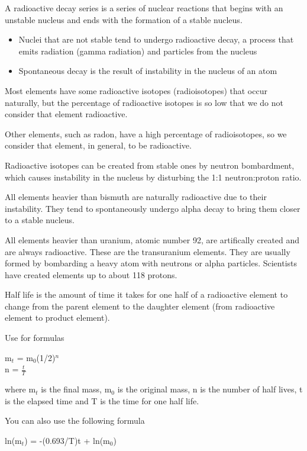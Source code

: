 \documentclass[../hchem.tex]{subfiles}
\begin{document}
A radioactive decay series is a series of nuclear reactions that begins with an unstable nucleus and ends with the formation of a stable nucleus.

\begin{itemize}
    \item Nuclei that are not stable tend to undergo radioactive decay, a process that emits radiation (gamma radiation) and particles from the nucleus 
    \item Spontaneous decay is the result of instability in the nucleus of an atom 
\end{itemize}

Most elements have some radioactive isotopes (radioisotopes) that occur naturally, but the percentage of radioactive isotopes is so low that we do not consider that element radioactive.

Other elements, such as radon, have a high percentage of radioisotopes, so we consider that element, in general, to be radioactive.

Radioactive isotopes can be created from stable ones by neutron bombardment, which causes instability in the nucleus by disturbing the 1:1 neutron:proton ratio.

All elements heavier than bismuth are naturally radioactive due to their instability. They tend to spontaneously undergo alpha decay to bring them closer to a stable nucleus.

All elements heavier than uranium, atomic number 92, are artifically created and are always radioactive. These are the transuranium elements. They are usually formed by bombarding a heavy atom with neutrons or alpha particles. Scientists have created elements 
up to about 118 protons.

Half life is the amount of time it takes for one half of a radioactive element to change from the parent element to the daughter element (from radioactive element to product element).

Use for formulas
\begin{center}
    m$_t$ = m$_0$(1/2)$^n$ \\ 
    n = $\frac{t}{T}$
\end{center}
where m$_t$ is the final mass, m$_0$ is the original mass, n is the number of half lives, t is the elapsed time and T is the time for one half life.

You can also use the following formula 
\begin{center}
    ln(m$_t$) = -(0.693/T)t + ln(m$_0$)
\end{center}
\end{document}
